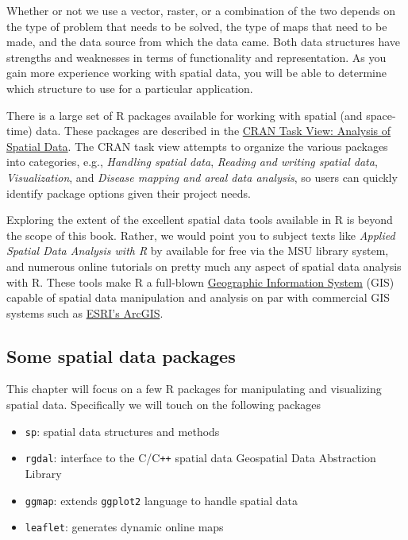 \documentclass[12pt,oneside]{book}\usepackage[]{graphicx}\usepackage[]{color}
\begin{document}
Whether or not we use a vector, raster, or a combination of the two depends on the type of problem that needs to be solved, the type of maps that need to be made, and the data source from which the data came. Both data structures have strengths and weaknesses in terms of functionality and representation. As you gain more experience working with spatial data, you will be able to determine which structure to use for a particular application.

There is a large set of R packages available for working with spatial (and space-time) data. These packages are described in the \href{https://CRAN.R-project.org/view=Spatial}{CRAN Task View: Analysis of Spatial Data}. The CRAN task view attempts to organize the various packages into categories, e.g., \emph{Handling spatial data}, \emph{Reading and writing spatial data}, \emph{Visualization}, and \emph{Disease mapping and areal data analysis}, so users can quickly identify package options given their project needs. 

Exploring the extent of the excellent spatial data tools available in R is beyond the scope of this book. Rather, we would point you to subject texts like \emph{Applied Spatial Data Analysis with R} by \cite{Bivand13} available for free via the MSU library system, and numerous online tutorials on pretty much any aspect of spatial data analysis with R. These tools make R a full-blown \href{https://en.wikipedia.org/wiki/Geographic\_information\_system}{Geographic Information System} (GIS) capable of spatial data manipulation and analysis on par with commercial GIS systems such as \href{http://www.esri.com/arcgis/about-arcgis}{ESRI's ArcGIS}. 

\subsection{Some spatial data packages}

This chapter will focus on a few R packages for manipulating and visualizing spatial data. Specifically we will touch on the following packages
\begin{itemize}
\item \verb+sp+: spatial data structures and methods 
\item \verb+rgdal+: interface to the C/C\texttt{++} spatial data Geospatial Data Abstraction Library
\item \verb+ggmap+: extends \verb+ggplot2+ language to handle spatial data
\item \verb+leaflet+: generates dynamic online maps 
\end{itemize}
\end{document}
